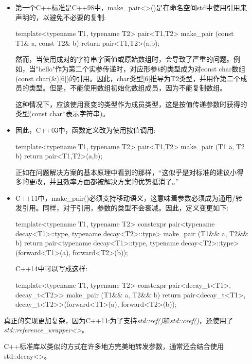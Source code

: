 \begin{itemize}
  \item 第一个C++标准是C++98中，make\_pair<>()是在命名空间std中使用引用来声明的，以避免不必要的复制:
\begin{codebox}[cpp]
  template<typename T1, typename T2>
  pair<T1,T2> make_pair (const T1& a, const T2& b)
  {
    return pair<T1,T2>(a,b);
  }
\end{codebox}
  然而，当使用成对的字符串字面值或原始数组时，会导致了严重的问题。例如，当"hello"作为第二个实参传递时，对应形参\textit{b}的类型成为对const char数组(const char(\&)[6])的引用。因此，char类型[6]推导为T2类型，并用作第二个成员的类型。但是，不能使用数组初始化数组成员，因为不能复制数组。\par
  这种情况下，应该使用衰变的类型作为成员类型，这是按值传递参数时获得的类型(const char*表示字符串)。

  \item 因此，C++03中，函数定义改为使用按值调用:
\begin{codebox}[cpp]
  template<typename T1, typename T2>
  pair<T1,T2> make_pair (T1 a, T2 b)
  {
    return pair<T1,T2>(a,b);
  }
\end{codebox}
  正如在问题解决方案的基本原理中看到的那样，“这似乎是对标准的建议小得多的更改，并且效率方面都被解决方案的优势抵消了。”

  \item C++11中，make\_pair()必须支持移动语义，这意味着参数必须成为通用/转发引用。同样，对于引用，参数的类型不会衰减。因此，定义变更如下:
\begin{codebox}[cpp]
  template<typename T1, typename T2>
  constexpr pair<typename decay<T1>::type, typename decay<T2>::type>
  make_pair (T1&& a, T2&& b)
  {
    return pair<typename decay<T1>::type,
    typename decay<T2>::type>(forward<T1>(a),
    forward<T2>(b));
  }
\end{codebox}
  C++14中可以写成这样:
\begin{codebox}[cpp]
  template<typename T1, typename T2>
  constexpr pair<decay_t<T1>, decay_t<T2>>
  make_pair (T1&& a, T2&& b)
  {
    return pair<decay_t<T1>, decay_t<T2>>(forward<T1>(a), forward<T2>(b));
  }
\end{codebox}
\end{itemize}

真正的实现更加复杂，因为C++11:为了支持\textit{std::ref()}和\textit{std::cref()}，还使用了\textit{std::\allowbreak{}reference\_\allowbreak{}wrapper<\allowbreak{}>}。\par

C++标准库以类似的方式在许多地方完美地转发参数，通常还会结合使用std::decay<>。\par

